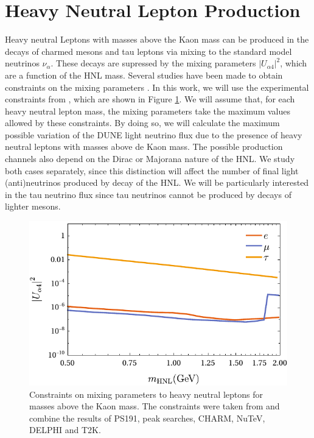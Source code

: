 \documentclass[aps,prd,twocolumn,superscriptaddress,amsmath,amssymb]{revtex4}
\newcommand{\lw}{\linewidth}
\begin{document}
\section{Heavy Neutral Lepton Production}
Heavy neutral Leptons with masses above the Kaon mass can be produced in the decays of charmed mesons and tau leptons via mixing to the standard model neutrinos $\nu_\alpha$. These decays are supressed by the mixing parameters $|U_{\alpha4}|^2$, which are a function of the HNL mass. Several studies have been made to obtain constraints on the mixing parameters \cite{pascoli2019,bondarenko2018, alekhin2016}. In this work, we will use the experimental constraints from \cite{pascoli2019}, which are shown in Figure \ref{fig:mixings}. We will assume that, for each heavy neutral lepton mass, the mixing parameters take the maximum values allowed by these constraints. By doing so, we will calculate the maximum possible variation of the DUNE light neutrino flux due to the presence of heavy neutral leptons with masses above de Kaon mass. The possible production channels also depend on the Dirac or Majorana nature of the HNL. We study both cases separately, since this distinction will affect the number of final light (anti)neutrinos produced by decay of the HNL. We will be particularly interested in the tau neutrino flux since tau neutrinos cannot be produced by decays of lighter mesons.

\begin{figure}[h]
\centering
\includegraphics[width=.9\lw]{plots/mixings.pdf}
\caption{Constraints on mixing parameters to heavy neutral leptons for masses above the Kaon mass. The constraints were taken from \cite{pascoli2019} and combine the results of PS191, peak searches, CHARM, NuTeV, DELPHI and T2K.}
\label{fig:mixings}
\end{figure}
\end{document}
